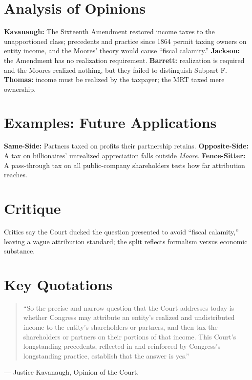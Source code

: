 \documentclass[12pt]{article}
\begin{document}
\section{Analysis of Opinions}
\textbf{Kavanaugh:} The Sixteenth Amendment restored income taxes to the unapportioned class; precedents and practice since 1864 permit taxing owners on entity income, and the Moores' theory would cause ``fiscal calamity.'' \textbf{Jackson:} the Amendment has no realization requirement. \textbf{Barrett:} realization is required and the Moores realized nothing, but they failed to distinguish Subpart F. \textbf{Thomas:} income must be realized by the taxpayer; the MRT taxed mere ownership.

\section{Examples: Future Applications}
\textbf{Same-Side:} Partners taxed on profits their partnership retains. \textbf{Opposite-Side:} A tax on billionaires' unrealized appreciation falls outside \textit{Moore}. \textbf{Fence-Sitter:} A pass-through tax on all public-company shareholders tests how far attribution reaches.

\section{Critique}
Critics say the Court ducked the question presented to avoid ``fiscal calamity,'' leaving a vague attribution standard; the split reflects formalism versus economic substance.

\section{Key Quotations}
\begin{quote}
``So the precise and narrow question that the Court addresses today is whether Congress may attribute an entity's realized and undistributed income to the entity's shareholders or partners, and then tax the shareholders or partners on their portions of that income. This Court's longstanding precedents, reflected in and reinforced by Congress's longstanding practice, establish that the answer is yes.''
\end{quote}
\noindent --- Justice Kavanaugh, Opinion of the Court.
\end{document}
